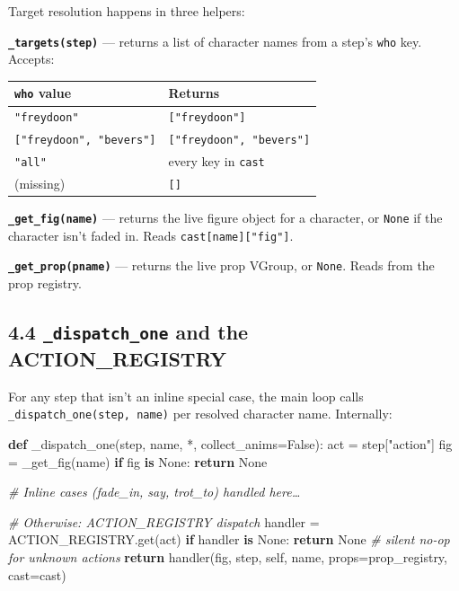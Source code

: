 \documentclass[
  12pt,
  letterpaper,
]{book}
\newenvironment{Shaded}{}{}
\newcommand{\CommentTok}[1]{\textcolor[rgb]{0.38,0.63,0.69}{\textit{#1}}}
\newcommand{\ControlFlowTok}[1]{\textcolor[rgb]{0.00,0.44,0.13}{\textbf{#1}}}
\newcommand{\KeywordTok}[1]{\textcolor[rgb]{0.00,0.44,0.13}{\textbf{#1}}}
\newcommand{\NormalTok}[1]{#1}
\newcommand{\OperatorTok}[1]{\textcolor[rgb]{0.40,0.40,0.40}{#1}}
\newcommand{\StringTok}[1]{\textcolor[rgb]{0.25,0.44,0.63}{#1}}
\newcommand{\VariableTok}[1]{\textcolor[rgb]{0.10,0.09,0.49}{#1}}
\begin{document}
Target resolution happens in three helpers:

\textbf{\texttt{\_targets(step)}} --- returns a list of character names
from a step's \texttt{who} key. Accepts:

\begin{longtable}[]{@{}ll@{}}
\toprule\noalign{}
\texttt{who} value & Returns \\
\midrule\noalign{}
\endhead
\bottomrule\noalign{}
\endlastfoot
\texttt{"freydoon"} & \texttt{{[}"freydoon"{]}} \\
\texttt{{[}"freydoon",\ "bevers"{]}} &
\texttt{{[}"freydoon",\ "bevers"{]}} \\
\texttt{"all"} & every key in \texttt{cast} \\
(missing) & \texttt{{[}{]}} \\
\end{longtable}

\textbf{\texttt{\_get\_fig(name)}} --- returns the live figure object
for a character, or \texttt{None} if the character isn't faded in. Reads
\texttt{cast{[}name{]}{[}"fig"{]}}.

\textbf{\texttt{\_get\_prop(pname)}} --- returns the live prop VGroup,
or \texttt{None}. Reads from the prop registry.

\subsection{\texorpdfstring{4.4 \texttt{\_dispatch\_one} and the
ACTION\_REGISTRY}{4.4 \_dispatch\_one and the ACTION\_REGISTRY}}\label{dispatch_one-and-the-action_registry}

For any step that isn't an inline special case, the main loop calls
\texttt{\_dispatch\_one(step,\ name)} per resolved character name.
Internally:

\begin{Shaded}
\begin{Highlighting}[]
\KeywordTok{def}\NormalTok{ \_dispatch\_one(step, name, }\OperatorTok{*}\NormalTok{, collect\_anims}\OperatorTok{=}\VariableTok{False}\NormalTok{):}
\NormalTok{    act }\OperatorTok{=}\NormalTok{ step[}\StringTok{"action"}\NormalTok{]}
\NormalTok{    fig }\OperatorTok{=}\NormalTok{ \_get\_fig(name)}
    \ControlFlowTok{if}\NormalTok{ fig }\KeywordTok{is} \VariableTok{None}\NormalTok{:}
        \ControlFlowTok{return} \VariableTok{None}

    \CommentTok{\# Inline cases (fade\_in, say, trot\_to) handled here…}

    \CommentTok{\# Otherwise: ACTION\_REGISTRY dispatch}
\NormalTok{    handler }\OperatorTok{=}\NormalTok{ ACTION\_REGISTRY.get(act)}
    \ControlFlowTok{if}\NormalTok{ handler }\KeywordTok{is} \VariableTok{None}\NormalTok{:}
        \ControlFlowTok{return} \VariableTok{None}    \CommentTok{\# silent no{-}op for unknown actions}
    \ControlFlowTok{return}\NormalTok{ handler(fig, step, }\VariableTok{self}\NormalTok{, name,}
\NormalTok{                   props}\OperatorTok{=}\NormalTok{prop\_registry, cast}\OperatorTok{=}\NormalTok{cast)}
\end{Highlighting}
\end{Shaded}
\end{document}
